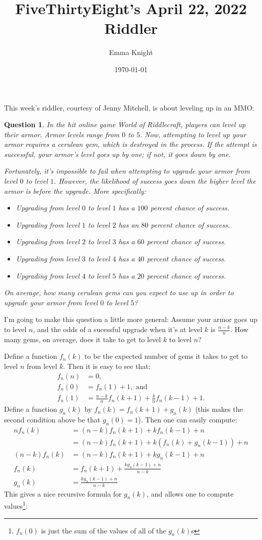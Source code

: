 \documentclass[11pt]{article}
\title{FiveThirtyEight's April 22, 2022 Riddler}
\author{Emma Knight}
\date{\today}
\newtheorem{question}[theorem]{Question}
\theoremstyle{definition}
\begin{document}
\maketitle
This week's riddler, courtesy of Jenny Mitchell, is about leveling up in an MMO:
\begin{question}
In the hit online game World of Riddlecraft, players can level up their armor. Armor levels range from $0$ to $5$. Now, attempting to level up your armor requires a cerulean gem, which is destroyed in the process. If the attempt is successful, your armor’s level goes up by one; if not, it goes down by one.

Fortunately, it’s impossible to fail when attempting to upgrade your armor from level $0$ to level $1$. However, the likelihood of success goes down the higher level the armor is before the upgrade. More specifically:
\begin{itemize}
\item Upgrading from level $0$ to level $1$ has a $100$ percent chance of success.
\item Upgrading from level $1$ to level $2$ has an $80$ percent chance of success.
\item Upgrading from level $2$ to level $3$ has a $60$ percent chance of success.
\item Upgrading from level $3$ to level $4$ has a $40$ percent chance of success.
\item Upgrading from level $4$ to level $5$ has a $20$ percent chance of success.
\end{itemize}
On average, how many cerulean gems can you expect to use up in order to upgrade your armor from level $0$ to level $5$?
\end{question}
I'm going to make this question a little more general: Assume your armor goes up to level $n$, and the odds of a sucessful upgrade when it's at level $k$ is $\frac{n-k}{n}$.  How many gems, on average, does it take to get to level $k$ to level $n$?

Define a function $f_n(k)$ to be the expected number of gems it takes to get to level $n$ from level $k$.  Then it is easy to see that:
\begin{align*}
f_n(n) & = 0, \\
f_n(0) & = f_n(1) + 1, \text{ and} \\
f_n(1) & = \frac{n-k}{n} f_n(k+1) + \frac{k}{n} f_n(k-1) + 1.
\end{align*}
Define a function $g_n(k)$ by $f_n(k) = f_n(k+1) + g_n(k)$ (this makes the second condition above be that $g_n(0) = 1$).  Then one can easily compute:
\begin{align*}
n f_n(k) & =(n-k) f_n(k+1) + k f_n(k-1) + n \\
& = (n-k) f_n(k+1) + k(f_n(k) + g_n(k-1)) + n \\
(n-k) f_n(k) & = (n-k) f_n(k+1) + kg_n(k-1) + n \\
f_n(k) & = f_n(k+1) + \frac{k g_n(k-1) + n}{n-k}\\
g_n(k) & = \frac{kg_n(k-1) + n}{n-k}
\end{align*}
This gives a nice recursive formula for $g_n(k)$, and allows one to compute values\footnote{$f_n(0)$ is just the sum of the values of all of the $g_n(k)$s}:
\end{document}

